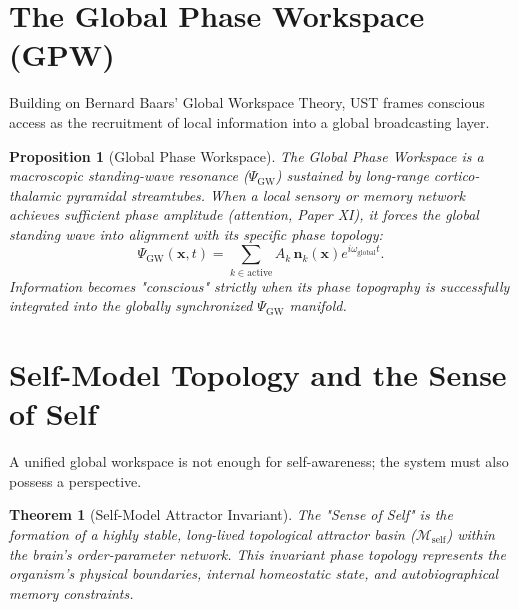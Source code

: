 \documentclass[11pt,a4paper]{article}
\newtheorem{prop}{Proposition}
\newtheorem{thm}{Theorem}
\begin{document}
	\section{The Global Phase Workspace (GPW)}
	\label{sec:global_workspace}
	
	Building on Bernard Baars' Global Workspace Theory, UST frames conscious access as the recruitment of local information into a global broadcasting layer.
	
	\begin{prop}[Global Phase Workspace]
		\label{prop:global_workspace}
		The Global Phase Workspace is a macroscopic standing-wave resonance ($\Psi_{\text{GW}}$) sustained by long-range cortico-thalamic pyramidal streamtubes. 
		When a local sensory or memory network achieves sufficient phase amplitude (attention, Paper XI), it forces the global standing wave into alignment with its specific phase topology:
		\begin{equation}
			\Psi_{\text{GW}}(\mathbf{x}, t) = \sum_{k \in \text{active}} A_k \, \mathbf{n}_k(\mathbf{x}) e^{i \omega_{\text{global}} t}.
			\label{eq:global_workspace_wave}
		\end{equation}
		Information becomes "conscious" strictly when its phase topography is successfully integrated into the globally synchronized $\Psi_{\text{GW}}$ manifold.
	\end{prop}
	
	\section{Self-Model Topology and the Sense of Self}
	\label{sec:self_model}
	
	A unified global workspace is not enough for self-awareness; the system must also possess a perspective. 
	
	\begin{thm}[Self-Model Attractor Invariant]
		\label{thm:self_model_attractor}
		The "Sense of Self" is the formation of a highly stable, long-lived topological attractor basin ($\mathcal{M}_{\text{self}}$) within the brain's order-parameter network. This invariant phase topology represents the organism's physical boundaries, internal homeostatic state, and autobiographical memory constraints.
	\end{thm}
	
\end{document}
